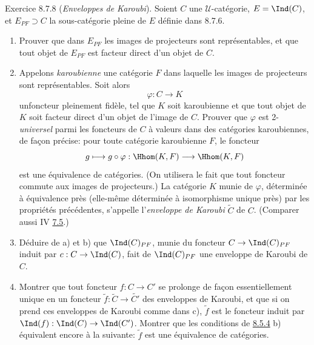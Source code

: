 \begin{enonce*}[remark]{Exercice 8.7.8}
(\emph{Enveloppes de Karoubi}). Soient $C$ une
$𝒰$-catégorie, $E=\Ind(C)$, et $E_{PF}\supset C$ %
la sous-catégorie pleine de $E$ définie dans 8.7.6.
\begin{enumerate}
\renewcommand{\theenumi}{\alph{enumi}}
\renewcommand{\labelenumi}{\theenumi)}
\item Prouver que dans $E_{PF}$ les images de projecteurs sont
représentables, et que tout objet de $E_{PF}$ est facteur direct
d'un objet de $C$.

\item Appelons \emph{karoubienne} une catégorie $F$ dans laquelle
les images de projecteurs sont représentables. Soit alors
$$
\varphi:C\longrightarrow K
$$
un\pageoriginale foncteur pleinement fidèle, tel que $K$ soit
karoubienne et que tout objet de $K$ soit facteur direct d'un objet
de l'image de $C$. Prouver que $\varphi$ est 2-\emph{universel}
parmi les foncteurs de $C$ à valeurs dans des catégories
karoubiennes, de façon précise: pour toute catégorie karoubienne
$F$, le foncteur
$$
g\longmapsto g\circ \varphi :\Hhom(K,F)\longrightarrow \Hhom(K,F)
$$
est une équivalence de catégories. (On utilisera le fait que tout
foncteur commute aux images de projecteurs.) La catégorie $K$ munie
de $\varphi$, déterminée à équivalence près (elle-même déterminée à
isomorphisme unique près) par les propriétés précédentes, s'appelle
l'\emph{enveloppe de Karoubi} $\widetilde{C}$ de $C$. (Comparer
aussi IV \hyperref[I.cor7.5]{7.5}.)

\item Déduire de a) et b) que $\Ind(C)_{PF}$, munie du foncteur
$C\rightarrow \Ind(C)_{PF}$ induit par $c:C\rightarrow \Ind(C)$,
fait de $\Ind(C)_{PF}$ une enveloppe de Karoubi de $C$.

\item Montrer que tout foncteur $f:C\rightarrow C'$ se prolonge de
façon essentiellement unique en un foncteur
$\widetilde{f}:\widetilde{C}\rightarrow\widetilde{C'}$ des
enveloppes de Karoubi, et que si on prend ces enveloppes de Karoubi
comme dans c), $\widetilde{f}$ est le foncteur induit par
$\Ind(f):\Ind(C)\rightarrow \Ind(C')$. Montrer que les conditions de
\hyperref[I.sec8.5.4]{8.5.4} %
b) %
équivalent encore à la suivante: $\widetilde{f}$ est une équivalence
de catégories.
\end{enumerate}
\end{enonce*}

